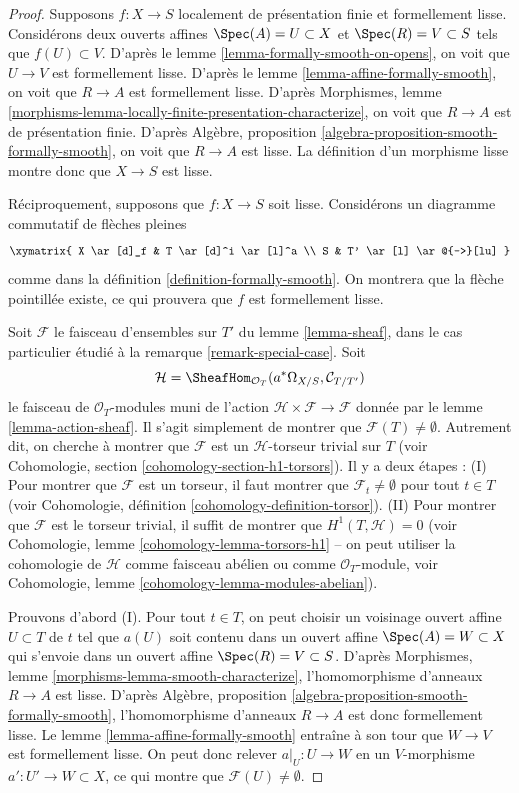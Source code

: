 \begin{proof}
Supposons $f : X \to S$ localement de présentation finie et formellement lisse.
Considérons deux ouverts affines $\Spec(A) = U \subset X$ et
$\Spec(R) = V \subset S$
tels que $f(U) \subset V$. D'après le lemme \ref{lemma-formally-smooth-on-opens},
on voit que $U \to V$ est formellement lisse. D'après le lemme
\ref{lemma-affine-formally-smooth}, on voit que $R \to A$ est formellement
lisse. D'après
Morphismes, lemme \ref{morphisms-lemma-locally-finite-presentation-characterize},
on voit que $R \to A$ est de présentation finie.
D'après Algèbre, proposition \ref{algebra-proposition-smooth-formally-smooth},
on voit que $R \to A$ est lisse.
La définition d'un morphisme lisse montre donc que $X \to S$ est lisse.

\medskip\noindent
Réciproquement, supposons que $f : X \to S$ soit lisse. Considérons un diagramme commutatif
de flèches pleines
$$
\xymatrix{
X \ar[d]_f & T \ar[d]^i \ar[l]^a \\
S & T' \ar[l] \ar@{-->}[lu]
}
$$
comme dans la définition \ref{definition-formally-smooth}.
On montrera que la flèche pointillée existe, ce qui
prouvera que $f$ est formellement lisse.

\medskip\noindent
Soit $\mathcal{F}$ le faisceau d'ensembles sur $T'$ du lemme \ref{lemma-sheaf},
dans le cas particulier étudié à la remarque \ref{remark-special-case}.
Soit
$$
\mathcal{H} =
\SheafHom_{\mathcal{O}_T}(a^*\Omega_{X/S}, \mathcal{C}_{T/T'})
$$
le faisceau de $\mathcal{O}_T$-modules muni de l'action
$\mathcal{H} \times \mathcal{F} \to \mathcal{F}$ donnée par
le lemme \ref{lemma-action-sheaf}. Il s'agit simplement
de montrer que $\mathcal{F}(T) \not = \emptyset$. Autrement dit, on
cherche à montrer que $\mathcal{F}$ est un $\mathcal{H}$-torseur trivial
sur $T$ (voir Cohomologie, section \ref{cohomology-section-h1-torsors}).
Il y a deux étapes : (I) Pour montrer que $\mathcal{F}$ est un torseur,
il faut montrer que $\mathcal{F}_t \not = \emptyset$ pour tout $t \in T$ (voir
Cohomologie, définition \ref{cohomology-definition-torsor}).
(II) Pour montrer que $\mathcal{F}$ est le torseur trivial, il suffit
de montrer que $H^1(T, \mathcal{H}) = 0$ (voir
Cohomologie, lemme \ref{cohomology-lemma-torsors-h1} --
on peut utiliser la cohomologie
de $\mathcal{H}$ comme faisceau abélien ou comme $\mathcal{O}_T$-module,
voir Cohomologie, lemme \ref{cohomology-lemma-modules-abelian}).

\medskip\noindent
Prouvons d'abord (I). Pour tout $t \in T$, on peut
choisir un voisinage ouvert affine $U \subset T$ de $t$
tel que $a(U)$ soit contenu
dans un ouvert affine $\Spec(A) = W \subset X$
qui s'envoie dans un ouvert affine $\Spec(R) = V \subset S$.
D'après Morphismes, lemme \ref{morphisms-lemma-smooth-characterize},
l'homomorphisme d'anneaux $R \to A$ est lisse.
D'après Algèbre, proposition \ref{algebra-proposition-smooth-formally-smooth},
l'homomorphisme d'anneaux $R \to A$ est donc formellement lisse.
Le lemme \ref{lemma-affine-formally-smooth}
entraîne à son tour que $W \to V$ est formellement lisse.
On peut donc relever $a|_U : U \to W$ en un $V$-morphisme
$a' : U' \to W \subset X$, ce qui montre que $\mathcal{F}(U) \not = \emptyset$.


\end{proof}
